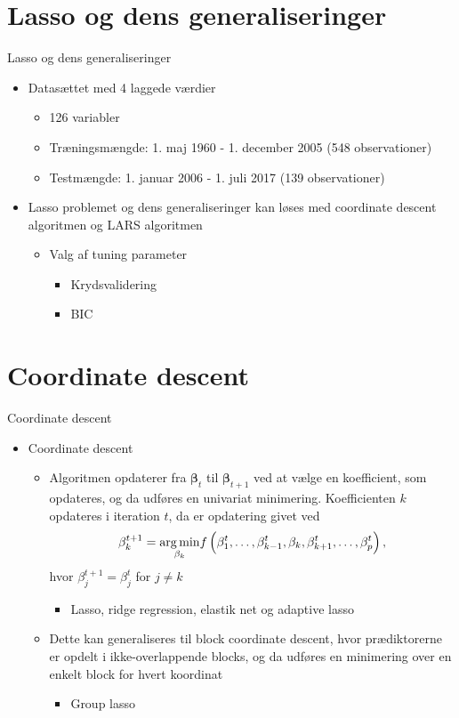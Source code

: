 \section{Lasso og dens generaliseringer}
\begin{frame}{Lasso og dens generaliseringer}
\begin{itemize}
\item Datasættet med 4 laggede værdier
\begin{itemize}
\item 126 variabler
\item Træningsmængde: 1. maj 1960 - 1. december 2005 (548 observationer)
\item Testmængde: 1. januar 2006 - 1. juli 2017 (139 observationer)
\end{itemize}
\item Lasso problemet og dens generaliseringer kan løses med coordinate descent algoritmen og LARS algoritmen
\begin{itemize}
\item Valg af tuning parameter
\begin{itemize}
\item Krydsvalidering
\item BIC
\end{itemize}
\end{itemize}
\end{itemize}
\end{frame}

\section{Coordinate descent}
\begin{frame}{Coordinate descent}
\begin{itemize}
\item Coordinate descent
\begin{itemize}
\item Algoritmen opdaterer fra $\boldsymbol \beta_t$ til  $\boldsymbol \beta_{t+1}$ ved at vælge en koefficient, som opdateres, og da udføres en univariat minimering. 
Koefficienten $k$ opdateres i iteration $t$, da er opdatering givet ved
\begin{align*}
\beta_k^{t+1} = \underset{\beta_k}{\arg\min} f\del{\beta_1^t,\dots, \beta_{k-1}^t, \beta_k, \beta_{k+1}^t, \dots, \beta_p^t },
\end{align*}
hvor 	$\beta_j^{t+1} = \beta^t_j$ for $j \neq k$
\begin{itemize}
\item Lasso, ridge regression, elastik net og adaptive lasso
\end{itemize}
\item Dette kan generaliseres til block coordinate descent, hvor prædiktorerne er opdelt i ikke-overlappende blocks, og da udføres en minimering over en enkelt block for hvert koordinat
\begin{itemize}
\item Group lasso
\end{itemize}
\end{itemize}
\end{itemize}
\end{frame}


